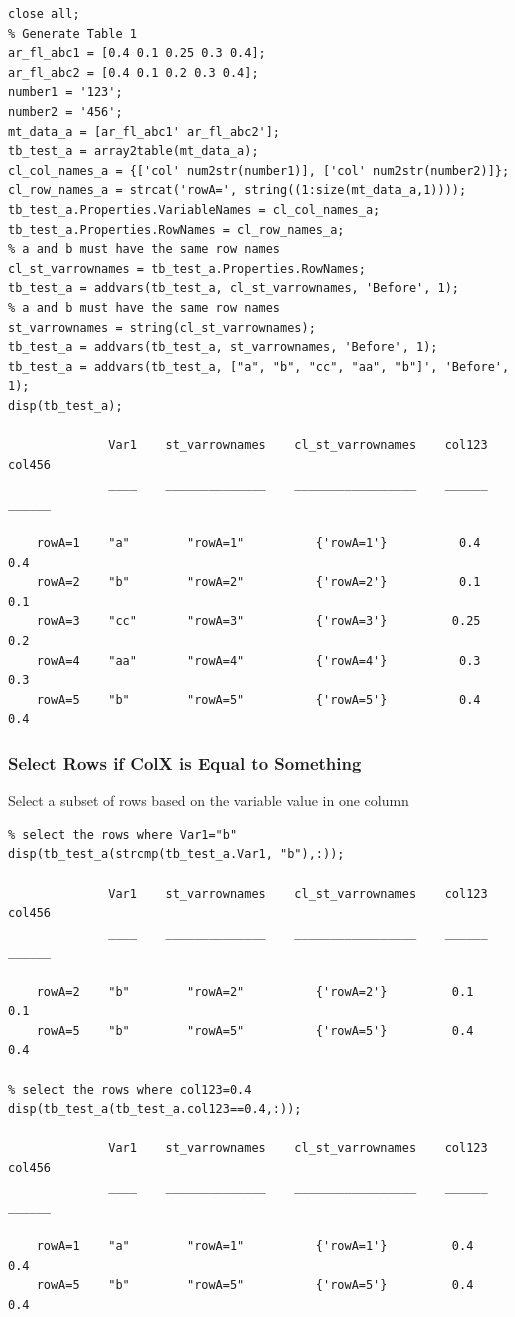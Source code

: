 \documentclass[
]{book}
\begin{document}
\begin{verbatim}
close all;
% Generate Table 1
ar_fl_abc1 = [0.4 0.1 0.25 0.3 0.4];
ar_fl_abc2 = [0.4 0.1 0.2 0.3 0.4];
number1 = '123';
number2 = '456';
mt_data_a = [ar_fl_abc1' ar_fl_abc2'];
tb_test_a = array2table(mt_data_a);
cl_col_names_a = {['col' num2str(number1)], ['col' num2str(number2)]};
cl_row_names_a = strcat('rowA=', string((1:size(mt_data_a,1))));
tb_test_a.Properties.VariableNames = cl_col_names_a;
tb_test_a.Properties.RowNames = cl_row_names_a;
% a and b must have the same row names
cl_st_varrownames = tb_test_a.Properties.RowNames;
tb_test_a = addvars(tb_test_a, cl_st_varrownames, 'Before', 1);
% a and b must have the same row names
st_varrownames = string(cl_st_varrownames);
tb_test_a = addvars(tb_test_a, st_varrownames, 'Before', 1);
tb_test_a = addvars(tb_test_a, ["a", "b", "cc", "aa", "b"]', 'Before', 1);
disp(tb_test_a);

              Var1    st_varrownames    cl_st_varrownames    col123    col456
              ____    ______________    _________________    ______    ______

    rowA=1    "a"        "rowA=1"          {'rowA=1'}          0.4      0.4  
    rowA=2    "b"        "rowA=2"          {'rowA=2'}          0.1      0.1  
    rowA=3    "cc"       "rowA=3"          {'rowA=3'}         0.25      0.2  
    rowA=4    "aa"       "rowA=4"          {'rowA=4'}          0.3      0.3  
    rowA=5    "b"        "rowA=5"          {'rowA=5'}          0.4      0.4  
\end{verbatim}

\hypertarget{select-rows-if-colx-is-equal-to-something}{%
\subsubsection{Select Rows if ColX is Equal to Something}\label{select-rows-if-colx-is-equal-to-something}}

Select a subset of rows based on the variable value in one column

\begin{verbatim}
% select the rows where Var1="b"
disp(tb_test_a(strcmp(tb_test_a.Var1, "b"),:));

              Var1    st_varrownames    cl_st_varrownames    col123    col456
              ____    ______________    _________________    ______    ______

    rowA=2    "b"        "rowA=2"          {'rowA=2'}         0.1       0.1  
    rowA=5    "b"        "rowA=5"          {'rowA=5'}         0.4       0.4  

% select the rows where col123=0.4
disp(tb_test_a(tb_test_a.col123==0.4,:));

              Var1    st_varrownames    cl_st_varrownames    col123    col456
              ____    ______________    _________________    ______    ______

    rowA=1    "a"        "rowA=1"          {'rowA=1'}         0.4       0.4  
    rowA=5    "b"        "rowA=5"          {'rowA=5'}         0.4       0.4  
\end{verbatim}
\end{document}
